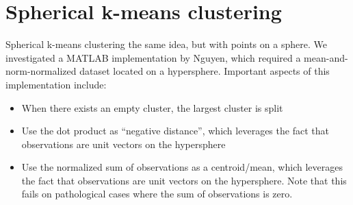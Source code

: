 \documentclass[../tech_report_1.tex]{subfiles}
\begin{document}
\section*{Spherical k-means clustering}

Spherical k-means clustering the same idea, but with points on a sphere.
We investigated a MATLAB implementation by Nguyen\cite{nguyen2008gene,nguyen_spherical_clustering},
which required a mean-and-norm-normalized dataset located on a hypersphere.
Important aspects of this implementation include:
\begin{itemize}
\item When there exists an empty cluster, the largest cluster is split
\item Use the dot product as ``negative distance'', which leverages the
fact that observations are unit vectors on the hypersphere
\item Use the normalized sum of observations as a centroid/mean, which leverages
the fact that observations are unit vectors on the hypersphere. Note
that this fails on pathological cases where the sum of observations
is zero.
\end{itemize}



\end{document}

